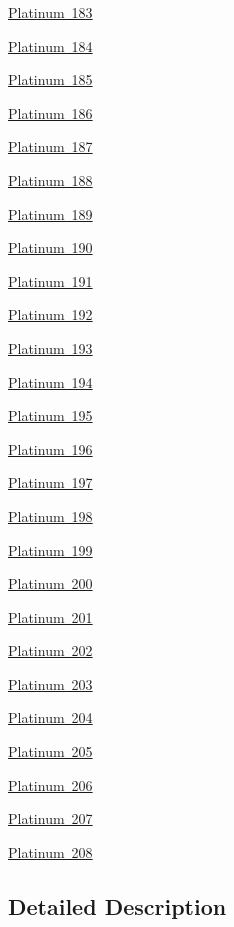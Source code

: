 \begin{DoxyCompactItemize}
\mbox{\hyperlink{group___isotope_const-_platinum-_pt183}{Platinum 183}}
\item 
\mbox{\hyperlink{group___isotope_const-_platinum-_pt184}{Platinum 184}}
\item 
\mbox{\hyperlink{group___isotope_const-_platinum-_pt185}{Platinum 185}}
\item 
\mbox{\hyperlink{group___isotope_const-_platinum-_pt186}{Platinum 186}}
\item 
\mbox{\hyperlink{group___isotope_const-_platinum-_pt187}{Platinum 187}}
\item 
\mbox{\hyperlink{group___isotope_const-_platinum-_pt188}{Platinum 188}}
\item 
\mbox{\hyperlink{group___isotope_const-_platinum-_pt189}{Platinum 189}}
\item 
\mbox{\hyperlink{group___isotope_const-_platinum-_pt190}{Platinum 190}}
\item 
\mbox{\hyperlink{group___isotope_const-_platinum-_pt191}{Platinum 191}}
\item 
\mbox{\hyperlink{group___isotope_const-_platinum-_pt192}{Platinum 192}}
\item 
\mbox{\hyperlink{group___isotope_const-_platinum-_pt193}{Platinum 193}}
\item 
\mbox{\hyperlink{group___isotope_const-_platinum-_pt194}{Platinum 194}}
\item 
\mbox{\hyperlink{group___isotope_const-_platinum-_pt195}{Platinum 195}}
\item 
\mbox{\hyperlink{group___isotope_const-_platinum-_pt196}{Platinum 196}}
\item 
\mbox{\hyperlink{group___isotope_const-_platinum-_pt197}{Platinum 197}}
\item 
\mbox{\hyperlink{group___isotope_const-_platinum-_pt198}{Platinum 198}}
\item 
\mbox{\hyperlink{group___isotope_const-_platinum-_pt199}{Platinum 199}}
\item 
\mbox{\hyperlink{group___isotope_const-_platinum-_pt200}{Platinum 200}}
\item 
\mbox{\hyperlink{group___isotope_const-_platinum-_pt201}{Platinum 201}}
\item 
\mbox{\hyperlink{group___isotope_const-_platinum-_pt202}{Platinum 202}}
\item 
\mbox{\hyperlink{group___isotope_const-_platinum-_pt203}{Platinum 203}}
\item 
\mbox{\hyperlink{group___isotope_const-_platinum-_pt204}{Platinum 204}}
\item 
\mbox{\hyperlink{group___isotope_const-_platinum-_pt205}{Platinum 205}}
\item 
\mbox{\hyperlink{group___isotope_const-_platinum-_pt206}{Platinum 206}}
\item 
\mbox{\hyperlink{group___isotope_const-_platinum-_pt207}{Platinum 207}}
\item 
\mbox{\hyperlink{group___isotope_const-_platinum-_pt208}{Platinum 208}}
\end{DoxyCompactItemize}


\subsection{Detailed Description}
